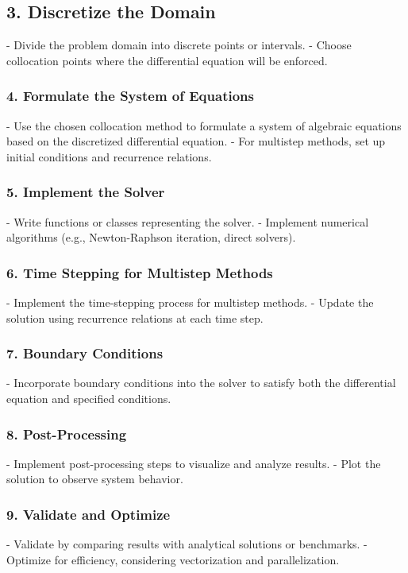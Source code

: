 \documentclass{report}
\begin{document}
\subsection{3. Discretize the Domain}
   - Divide the problem domain into discrete points or intervals.
   - Choose collocation points where the differential equation will be enforced.

\subsubsection{4. Formulate the System of Equations}
   - Use the chosen collocation method to formulate a system of algebraic equations based on the discretized differential equation.
   - For multistep methods, set up initial conditions and recurrence relations.

\subsubsection{5. Implement the Solver}
   - Write functions or classes representing the solver.
   - Implement numerical algorithms (e.g., Newton-Raphson iteration, direct solvers).

\subsubsection{6. Time Stepping for Multistep Methods}
   - Implement the time-stepping process for multistep methods.
   - Update the solution using recurrence relations at each time step.

\subsubsection{7. Boundary Conditions}
   - Incorporate boundary conditions into the solver to satisfy both the differential equation and specified conditions.

\subsubsection{8. Post-Processing}
   - Implement post-processing steps to visualize and analyze results.
   - Plot the solution to observe system behavior.

\subsubsection{9. Validate and Optimize}
   - Validate by comparing results with analytical solutions or benchmarks.
   - Optimize for efficiency, considering vectorization and parallelization.
\end{document}

